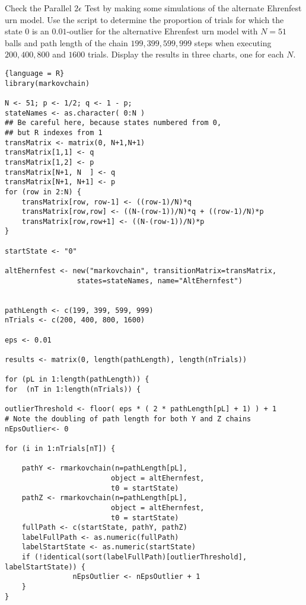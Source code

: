 \documentclass[12pt]{article}
\begin{document}
\begin{exercise}
   Check the Parallel \(2 \epsilon\) Test by making some
   simulations of the alternate Ehrenfest urn model.
   Use the script to determine the proportion of trials for which the
    state \( 0 \) is an \( 0.01 \)-outlier for the alternative Ehrenfest
    urn model with \( N = 51 \) balls and path length of the
    chain \( 199, 399, 599, 999 \) steps when executing \( 200, 400, 800
    \) and \( 1600 \) trials.  Display the results in three charts, one
    for each \( N \).
\end{exercise}
\begin{solution}

  \begin{lstlisting}{language = R}
library(markovchain)

N <- 51; p <- 1/2; q <- 1 - p;
stateNames <- as.character( 0:N )
## Be careful here, because states numbered from 0,
## but R indexes from 1
transMatrix <- matrix(0, N+1,N+1)
transMatrix[1,1] <- q
transMatrix[1,2] <- p
transMatrix[N+1, N  ] <- q
transMatrix[N+1, N+1] <- p
for (row in 2:N) {
    transMatrix[row, row-1] <- ((row-1)/N)*q
    transMatrix[row,row] <- ((N-(row-1))/N)*q + ((row-1)/N)*p
    transMatrix[row,row+1] <- ((N-(row-1))/N)*p
}

startState <- "0"

altEhernfest <- new("markovchain", transitionMatrix=transMatrix,
                 states=stateNames, name="AltEhernfest")


pathLength <- c(199, 399, 599, 999)
nTrials <- c(200, 400, 800, 1600)

eps <- 0.01

results <- matrix(0, length(pathLength), length(nTrials))

for (pL in 1:length(pathLength)) {
for  (nT in 1:length(nTrials)) {

outlierThreshold <- floor( eps * ( 2 * pathLength[pL] + 1) ) + 1
# Note the doubling of path length for both Y and Z chains
nEpsOutlier<- 0

for (i in 1:nTrials[nT]) {
            
    pathY <- rmarkovchain(n=pathLength[pL],
                         object = altEhernfest,
                         t0 = startState)
    pathZ <- rmarkovchain(n=pathLength[pL],
                         object = altEhernfest,
                         t0 = startState)
    fullPath <- c(startState, pathY, pathZ)
    labelFullPath <- as.numeric(fullPath)
    labelStartState <- as.numeric(startState)
    if (!identical(sort(labelFullPath)[outlierThreshold], labelStartState)) {
                nEpsOutlier <- nEpsOutlier + 1
    }
}


\end{lstlisting}
\end{solution}
\end{document}
